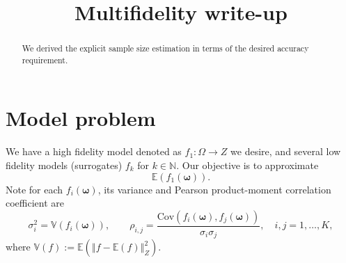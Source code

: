 \documentclass[final,3p,times,11pt]{elsarticle}
\begin{document}
\begin{frontmatter}
\title{Multifidelity write-up}
\begin{abstract}
We derived the explicit sample size estimation in terms of the desired accuracy requirement.
\end{abstract}
\end{frontmatter}



\section{Model problem}\label{sec:Problem_setup}
We have a high fidelity model denoted as $f_1: \Omega \rightarrow Z$ we desire, and several low fidelity models (surrogates) $f_k$ for $k\in \mathbb{N}$. Our objective is to approximate 
\[
\mathbb{E}\left(f_1(\boldsymbol{\omega})\right).
\]
Note for each $f_i(\boldsymbol{\omega})$, its variance and Pearson product-moment correlation coefficient are 
\begin{equation*}
    \sigma_i^2 = \mathbb{V}\left(f_i(\boldsymbol{\omega})\right),\qquad \rho_{i,j} = \frac{\text{Cov}\left(f_i(\boldsymbol{\omega}),f_j(\boldsymbol{\omega})\right)}{\sigma_i\sigma_j}, \quad i,j=1,\dots, K,
\end{equation*}
where $\mathbb{V}(f) := \mathbb{E}\left(\left\Vert f - \mathbb{E}(f)\right\Vert_Z^2\right)$.
\end{document}

